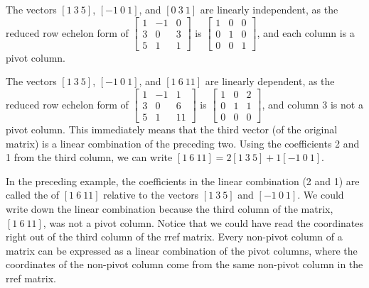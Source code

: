 \begin{example}
The vectors 
$[1\ 3\ 5]$,
$[-1\ 0\ 1]$, and
$[0\ 3\ 1]$ 
are linearly independent, as the reduced row echelon form of 
$ \begin{bmatrix} 1&-1&0\\3&0&3\\5&1&1\end{bmatrix}$ is 
$ \begin{bmatrix} 1&0&0\\0&1&0\\0&0&1\end{bmatrix}$, 
and each column is a pivot column.
\end{example}
\begin{example}
The vectors $[1\ 3\ 5]$, 
$[-1\ 0\ 1]$, and $[1\ 6\ 11]$
are linearly dependent, as the reduced row echelon form of 
$ \begin{bmatrix} 1&-1&1\\3&0&6\\5&1&11\end{bmatrix} $ 
is 
$ \begin{bmatrix} 1&0&2\\0&1&1\\0&0&0\end{bmatrix}$, 
and column 3 is not a pivot column. This immediately means that the third vector (of the original matrix) is a linear combination of the preceding two. Using the coefficients 2 and 1 from the third column, we can write 
$[1\ 6\ 11] = 2 [1\ 3\ 5]+1[-1\ 0\ 1]$. 
\end{example}
In the preceding example, the coefficients in the linear combination (2 and 1) are called the  of $[1~6~11]$ relative to the vectors $[1~3~5]$ and $[-1~0~1]$.  We could write down the linear combination because the third column of the matrix, $[1~6~11]$, was not a pivot column.  Notice that we could have read the coordinates right out of the third column of the rref matrix.  Every non-pivot column of a matrix can be expressed as a linear combination of the pivot columns, where the coordinates of the non-pivot column come from the same non-pivot column in the rref matrix.


